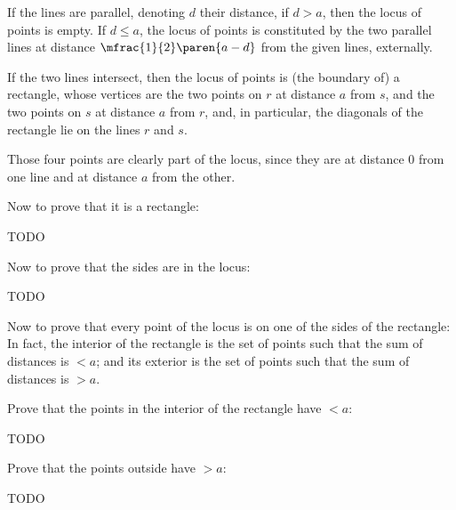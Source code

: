 If the lines are parallel, denoting $d$ their distance,
if $d > a$, then the locus of points is empty.
If $d \leq a$, the locus of points is constituted by the two parallel lines at distance $\mfrac{1}{2} \paren{a - d}$ from the given lines, externally.

\medskip
If the two lines intersect, then the locus of points is (the boundary of) a rectangle,
whose vertices are the two points on $r$ at distance $a$ from $s$,
and the two points on $s$ at distance $a$ from $r$,
and, in particular, the diagonals of the rectangle lie on the lines $r$ and $s$.

Those four points are clearly part of the locus,
since they are at distance $0$ from one line and at distance $a$ from the other.

Now to prove that it is a rectangle:

TODO


Now to prove that the sides are in the locus:

TODO


Now to prove that every point of the locus is on one of the sides of the rectangle:
    In fact, the interior of the rectangle is the set of points such that the sum of distances is $< a$;
    and its exterior is the set of points such that the sum of distances is $> a$.

    Prove that the points in the interior of the rectangle have $< a$:

    TODO


    Prove that the points outside have $> a$:

    TODO
